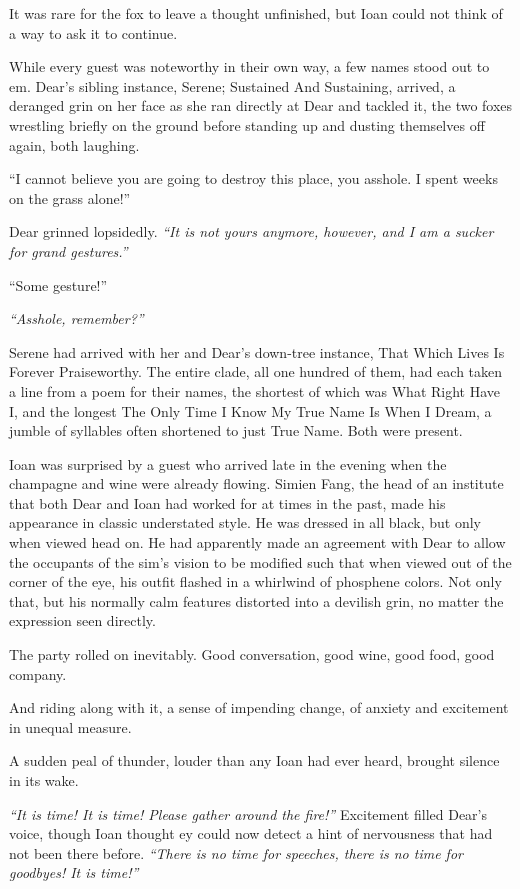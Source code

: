 It was rare for the fox to leave a thought unfinished, but Ioan could not think of a way to ask it to continue.

While every guest was noteworthy in their own way, a few names stood out to em. Dear's sibling instance, Serene; Sustained And Sustaining, arrived, a deranged grin on her face as she ran directly at Dear and tackled it, the two foxes wrestling briefly on the ground before standing up and dusting themselves off again, both laughing.

``I cannot believe you are going to destroy this place, you asshole. I spent weeks on the grass alone!''

Dear grinned lopsidedly. \emph{``It is not yours anymore, however, and I am a sucker for grand gestures.''}

``Some gesture!''

\emph{``Asshole, remember?''}

Serene had arrived with her and Dear's down-tree instance, That Which Lives Is Forever Praiseworthy. The entire clade, all one hundred of them, had each taken a line from a poem for their names, the shortest of which was What Right Have I, and the longest The Only Time I Know My True Name Is When I Dream, a jumble of syllables often shortened to just True Name. Both were present.

Ioan was surprised by a guest who arrived late in the evening when the champagne and wine were already flowing. Simien Fang, the head of an institute that both Dear and Ioan had worked for at times in the past, made his appearance in classic understated style. He was dressed in all black, but only when viewed head on. He had apparently made an agreement with Dear to allow the occupants of the sim's vision to be modified such that when viewed out of the corner of the eye, his outfit flashed in a whirlwind of phosphene colors. Not only that, but his normally calm features distorted into a devilish grin, no matter the expression seen directly.

The party rolled on inevitably. Good conversation, good wine, good food, good company.

And riding along with it, a sense of impending change, of anxiety and excitement in unequal measure.

A sudden peal of thunder, louder than any Ioan had ever heard, brought silence in its wake.

\emph{``It is time! It is time! Please gather around the fire!''} Excitement filled Dear's voice, though Ioan thought ey could now detect a hint of nervousness that had not been there before. \emph{``There is no time for speeches, there is no time for goodbyes! It is time!''}

